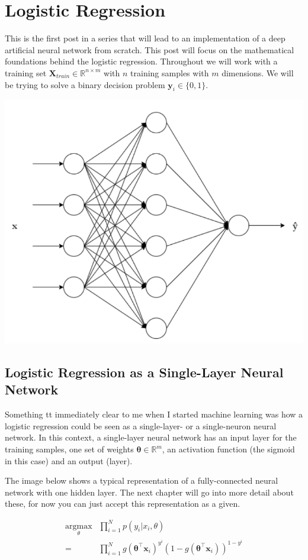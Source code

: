\documentclass{article}
\begin{document}
\section{Logistic Regression}
This is the first post in a series that will lead to an implementation of a deep artificial neural network from scratch. 
This post will focus on the mathematical foundations behind the logistic regression. 
Throughout we will work with a training set $\mathbf{X}_{train} \in \mathbb{R}^{n\times m}$ with $n$ training samples with $m$ dimensions. We will be trying to solve a binary decision problem $\mathbf{y}_i\in\{0,1\}$. 

\includegraphics[scale=0.25]{210803_img1}

\subsection{Logistic Regression as a Single-Layer Neural Network}
Something tt immediately clear to me when I started machine learning was how a logistic regression could be seen as a single-layer- or a single-neuron neural network. In this context, a single-layer neural network has an input layer for the training samples, one set of weights $\mathbf{\theta}\in \mathbb{R}^{m}$, an activation function (the sigmoid in this case) and an output (layer).

The image below shows a typical representation of a fully-connected neural network with one hidden layer. The next chapter will go into more detail about these, for now you can just accept this representation as a given. 

\begin{align}
    \underset{\theta}{\text{argmax}} &\prod^N_{i=1} p(y_i|x_i, \theta) \\ 
    = &\prod^N_{i=1} g(\mathbf{\theta}^{\top} \mathbf{x}_i)^{y^i}(1-g(\mathbf{\theta}^{\top} \mathbf{x}_i))^{1-y^i}
\end{align}
\end{document}
